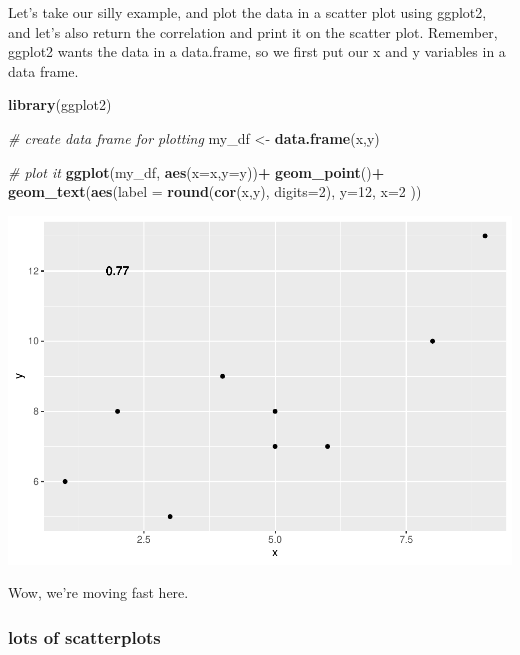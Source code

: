 \documentclass[
]{book}
\newenvironment{Shaded}{\begin{snugshade}}{\end{snugshade}}
\newcommand{\AttributeTok}[1]{\textcolor[rgb]{0.13,0.29,0.53}{#1}}
\newcommand{\CommentTok}[1]{\textcolor[rgb]{0.56,0.35,0.01}{\textit{#1}}}
\newcommand{\DecValTok}[1]{\textcolor[rgb]{0.00,0.00,0.81}{#1}}
\newcommand{\FunctionTok}[1]{\textcolor[rgb]{0.13,0.29,0.53}{\textbf{#1}}}
\newcommand{\NormalTok}[1]{#1}
\newcommand{\OtherTok}[1]{\textcolor[rgb]{0.56,0.35,0.01}{#1}}
\newcommand{\SpecialCharTok}[1]{\textcolor[rgb]{0.81,0.36,0.00}{\textbf{#1}}}
\begin{document}
Let's take our silly example, and plot the data in a scatter plot using ggplot2, and let's also return the correlation and print it on the scatter plot. Remember, ggplot2 wants the data in a data.frame, so we first put our x and y variables in a data frame.

\begin{Shaded}
\begin{Highlighting}[]
\FunctionTok{library}\NormalTok{(ggplot2)}

\CommentTok{\# create data frame for plotting}
\NormalTok{my\_df }\OtherTok{\textless{}{-}} \FunctionTok{data.frame}\NormalTok{(x,y)}

\CommentTok{\# plot it}
\FunctionTok{ggplot}\NormalTok{(my\_df, }\FunctionTok{aes}\NormalTok{(}\AttributeTok{x=}\NormalTok{x,}\AttributeTok{y=}\NormalTok{y))}\SpecialCharTok{+}
  \FunctionTok{geom\_point}\NormalTok{()}\SpecialCharTok{+}
  \FunctionTok{geom\_text}\NormalTok{(}\FunctionTok{aes}\NormalTok{(}\AttributeTok{label =} \FunctionTok{round}\NormalTok{(}\FunctionTok{cor}\NormalTok{(x,y), }\AttributeTok{digits=}\DecValTok{2}\NormalTok{), }\AttributeTok{y=}\DecValTok{12}\NormalTok{, }\AttributeTok{x=}\DecValTok{2}\NormalTok{ ))}
\end{Highlighting}
\end{Shaded}

\includegraphics{Statistics_Lab_files/figure-latex/unnamed-chunk-282-1.pdf}

Wow, we're moving fast here.

\hypertarget{lots-of-scatterplots}{%
\subsubsection{lots of scatterplots}\label{lots-of-scatterplots}}
\end{document}
